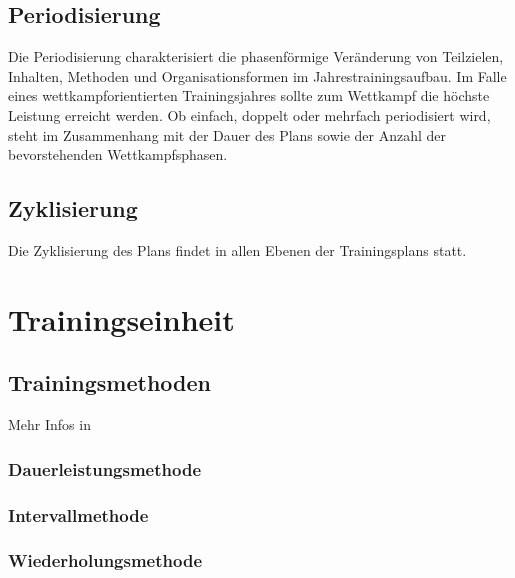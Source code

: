 \subsection{Periodisierung}
Die Periodisierung charakterisiert die phasenförmige Veränderung von Teilzielen, Inhalten, Methoden und Organisationsformen im Jahrestrainingsaufbau.
Im Falle eines wettkampforientierten Trainingsjahres sollte zum Wettkampf die höchste Leistung erreicht werden. \cite[279]{Trainingswissenschaft}
Ob einfach, doppelt oder mehrfach periodisiert wird, steht im Zusammenhang mit der Dauer des Plans sowie der Anzahl der bevorstehenden Wettkampfsphasen.

\subsection{Zyklisierung}
Die Zyklisierung des Plans findet in allen Ebenen der Trainingsplans statt.

\section{Trainingseinheit}
\label{grundlagen:einheiten}
    \subsection{Trainingsmethoden}
        Mehr Infos in \cite[40]{Radsporttraining}
        \subsubsection{Dauerleistungsmethode}
        \subsubsection{Intervallmethode}
        \subsubsection{Wiederholungsmethode}
